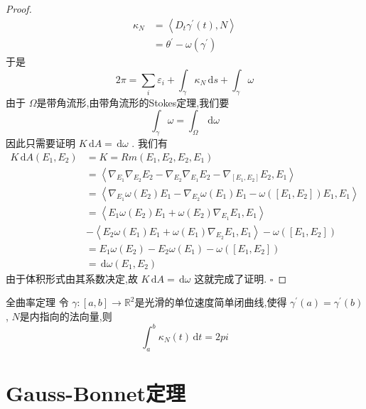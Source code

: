 \documentclass[../../几何与拓扑.tex]{subfiles}
\begin{document}
\begin{proof}
\[\begin{aligned}
     \kappa _{N}&= \left<D_{t} \gamma ^{\prime} \left( t \right),N  \right> \\ 
      & =  \theta ^{\prime} -  \omega \left(  \gamma ^{\prime}  \right) 
    \end{aligned}
    \]于是 \[
    2\pi = \sum _{i} \varepsilon _{i}+\int_{ \gamma } \kappa _{N}\,\mathrm{d} s + \int_{ \gamma } \omega  
    \]由于 \(   \Omega   \)是带角流形,由带角流形的Stokes定理,我们要 \[
    \int_{ \gamma } \omega = \int_{ \Omega }\,\mathrm{d}  \omega 
    \] 因此只需要证明 \(  K\,\mathrm{d} A= \,\mathrm{d}  \omega   \) .
    我们有 \[
    \begin{aligned}
    K\,\mathrm{d} A\left( E_1,E_2 \right)& = K=   Rm \left( E_1,E_2,E_2,E_1 \right) \\ 
     & = \left< \nabla _{E_1} \nabla _{E_2}E_2- \nabla _{E_2} \nabla _{E_1}E_2- \nabla _{\left[ E_1,E_2 \right] }E_2,E_1 \right>\\ 
      & = \left< \nabla _{E_1} \omega \left( E_2 \right)E_1- \nabla _{E_2} \omega \left( E_1 \right)E_1-  \omega \left( \left[ E_1,E_2 \right]  \right)E_1,E_1    \right>\\ 
       & = \left<E_1 \omega \left( E_2 \right)E_1+  \omega \left( E_2 \right) \nabla _{E_1}E_1  ,E_1 \right>\\ 
        & -\left<E_2 \omega \left( E_1 \right)E_1+  \omega \left( E_1 \right) \nabla _{E_2}E_1  ,E_1 \right>- \omega \left( [E_1,E_2] \right) \\ 
         & = E_1 \omega \left( E_2 \right)-E_2 \omega \left( E_1 \right)- \omega \left( [E_1,E_2] \right)   \\ 
          & = \,\mathrm{d}  \omega \left( E_1,E_2 \right) 
    \end{aligned}
    \]由于体积形式由其系数决定,故 \( K \,\mathrm{d} A= \,\mathrm{d}  \omega   \) 这就完成了证明.
    \hfill $\square$
\end{proof}
\begin{corollary}{全曲率定理}
    令 \(   \gamma :\left[ a,b \right]\to \mathbb{R} ^{2}   \)是光滑的单位速度简单闭曲线,使得 \(   \gamma ^{\prime} \left( a \right)=  \gamma ^{\prime} \left( b \right)    \), \(  N  \)是内指向的法向量,则 \[
    \int_{a}^{b} \kappa _{N}\left( t \right)\,\mathrm{d} t= 2pi 
    \]   
\end{corollary}

\section{Gauss-Bonnet定理}
\end{document}
